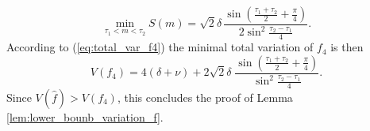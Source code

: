 \documentclass{article}
\begin{document}

\begin{equation*} %
    \min_{\tau_1 < m < \tau_2} S(m)  = \sqrt 2 \delta\,\frac{\sin\left(\frac{\tau_1+\tau_2}{2}+\frac\pi4\right)}{2\sin^2\frac{\tau_2-\tau_1}{4}}.
\end{equation*}
According to (\ref{eq:total_var_f4}) the minimal total variation of $f_4$ is then
\begin{equation} \label{eq:V4_min}
    V(f_4) = 4(\delta + \nu) + 2\sqrt 2 \delta\;\frac{\sin\left(\frac{\tau_1+\tau_2}{2}+\frac\pi4\right)}{\sin^2\frac{\tau_2-\tau_1}{4}}.
\end{equation}
Since $V(\hat f) > V(f_4)$, this concludes the proof of Lemma \ref{lem:lower_bounb_variation_f}.    
\end{document}
